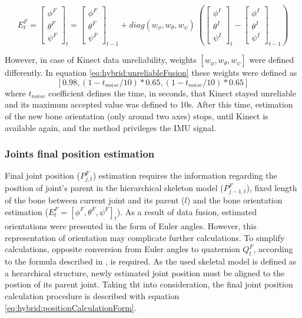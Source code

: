 \documentclass[sensors,article,submit,moreauthors,pdftex,10pt,a4paper]{mdpi}
\begin{document}
	
	\begin{equation} 
		\label{eq:hybrid:unreliableFusion}
		E^F_t = 
		\begin{bmatrix}  \phi^F \\  \theta^F \\  \psi^F \end{bmatrix}_t = 
		\begin{bmatrix}  \phi^F \\  \theta^F \\  \psi^F \end{bmatrix}_{t-1} +
		diag(w_\phi,w_\theta,w_\psi)\
		(\begin{bmatrix}  \phi^I \\  \theta^I \\  \psi^I \end{bmatrix}_t -
		\begin{bmatrix}  \phi^I \\  \theta^I \\  \psi^I \end{bmatrix}_{t-1})
	\end{equation}
	
	However, in case of Kinect data unreliability, weights $[w_\phi , w_\theta , w_\psi]$ were defined differently. In equation \ref{eq:hybrid:unreliableFusion} these weights were defined as $$[0.98,(1-t_{noise}/10)*0.65,(1-t_{noise}/10)*0.65]$$ where $t_{noise}$ coefficient defines the time, in seconds, that Kinect stayed unreliable and its maximum accepted value was defined to 10s. After this time, estimation of the new bone orientation (only around two axes) stops, until Kinect is available again, and the method privileges the IMU signal.
	
	\subsubsection{Joints final position estimation}
	Final joint position ($P_{j,t}^F$) estimation requires the information regarding the position of joint’s parent in the hierarchical skeleton model ($P_{j-1,t}^F$), fixed length of the bone between current joint and its parent ($l$) and the bone orientation estimation ($E_t^F=[\phi^F,\theta^F,\psi^F]_t$). As a result of data fusion, estimated orientations were presented in the form of Euler angles. However, this representation of orientation may complicate further calculations. To simplify calculations, opposite conversion from Euler angles to quaternion $Q_t^F$, according to the formula described in \cite{Dunn2011}, is required. As the used skeletal model is defined as a herarchical structure, newly estimated joint position must be aligned to the postion of its parent joint. Taking tht into consideration, the final joint position calculation procedure is described with equation \ref{eq:hybrid:positionCalculationForm}.
	
\end{document}
